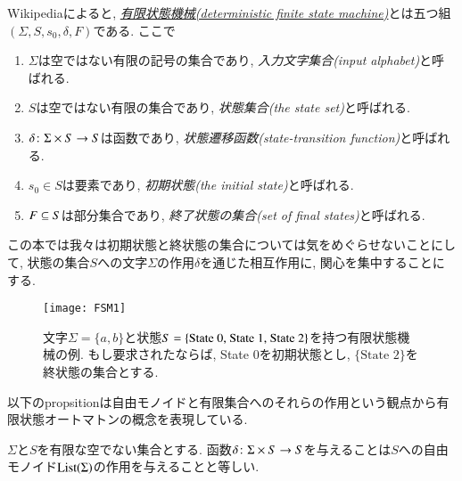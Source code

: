 Wikipediaによると, \href{http://en.wikipedia.org/wiki/Finite_state_machine#Mathematical_model}{\emph{有限状態機械(deterministic finite state machine)}}とは五つ組$(\Sigma,S,s_0,\delta,F)$である. ここで
\begin{enumerate}
\item $\Sigma$は空ではない有限の記号の集合であり, \emph{入力文字集合(input alphabet)}と呼ばれる.
\item $S$は空ではない有限の集合であり, \emph{状態集合(the state set)}と呼ばれる.
\item $\delta\taking \Sigma\times S\to S$は函数であり, \emph{状態遷移函数(state-transition function)}と呼ばれる.
\item $s_0\in S$は要素であり, \emph{初期状態(the initial state)}と呼ばれる.
\item $F\ss S$は部分集合であり, \emph{終了状態の集合(set of final states)}と呼ばれる.
\end{enumerate}


この本では我々は初期状態と終状態の集合については気をめぐらせないことにして, 状態の集合$S$への文字$\Sigma$の作用$\delta$を通じた相互作用に, 関心を集中することにする.

\begin{figure}[h]
\centering
\texttt{[image: FSM1]}
\caption{文字$\Sigma=\{a,b\}$と状態$S=\{\tn{State 0, State 1, State 2}\}$を持つ有限状態機械の例. もし要求されたならば, State 0を初期状態とし, $\{\text{State 2}\}$を終状態の集合とする.}
\end{figure}\label{fig:fsa}
以下のpropsitionは自由モノイドと有限集合へのそれらの作用という観点から有限状態オートマトンの概念を表現している.

\begin{proposition}


$\Sigma$と$S$を有限な空でない集合とする. 函数$\delta\taking\Sigma\times S\to S$を与えることは$S$への自由モノイド$\List(\Sigma)$の作用を与えることと等しい.

\end{proposition}

